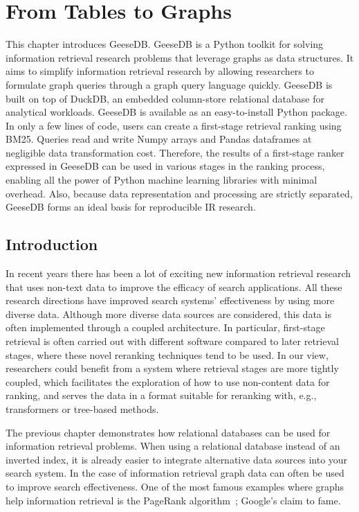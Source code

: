 \chapter{From Tables to Graphs}
\label{from-tables-to-graphs}

\begin{Abstract}
	\begin{changemargin}{1cm}{1cm}
		This chapter introduces GeeseDB. GeeseDB is a Python toolkit for solving information retrieval research problems that leverage graphs as data structures. It aims to simplify information retrieval research by allowing researchers to formulate graph queries through a graph query language quickly. GeeseDB is built on top of DuckDB, an embedded column-store relational database for analytical workloads. GeeseDB is available as an easy-to-install Python package. In only a few lines of code, users can create a first-stage retrieval ranking using BM25. Queries read and write Numpy arrays and Pandas dataframes at negligible data transformation cost. Therefore, the results of a first-stage ranker expressed in GeeseDB can be used	in various stages in the ranking process, enabling all the power of Python machine learning libraries with minimal overhead. Also, because data representation and processing are strictly separated, GeeseDB forms an ideal basis for reproducible IR research.
	\end{changemargin}
\end{Abstract}

\section{Introduction}
In recent years there has been a lot of exciting new information retrieval research that uses non-text data to improve the efficacy of search applications. All these research directions have improved search systems' effectiveness by using more diverse data. Although more diverse data sources are considered, this data is often implemented through a coupled architecture. In particular, first-stage retrieval is often carried out with different software compared to later retrieval stages, where these novel reranking techniques tend to be used. In our view, researchers could benefit from a system where retrieval stages are more tightly coupled, which facilitates the exploration of how to use non-content data for ranking, and serves the data in a format suitable for reranking with, e.g., transformers or tree-based methods.

The previous chapter demonstrates how relational databases can be used for information retrieval problems. When using a relational database instead of an inverted index, it is already easier to integrate alternative data sources into your search system. In the case of information retrieval graph data can often be used to improve search effectiveness. One of the most famous examples where graphs help information retrieval is the PageRank algorithm~\citep{pagerank}; Google's claim to fame. 

